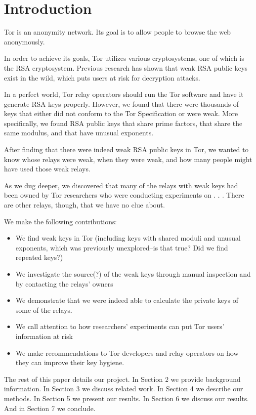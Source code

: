 \section{Introduction}
Tor is an anonymity network.  Its goal is to allow people to browse 
the web anonymously.

In order to achieve its goals, Tor utilizes various cryptosystems, 
one of which is the RSA cryptosystem.  Previous research has 
shown that weak RSA public keys exist in the wild, which puts users at 
risk for decryption attacks.  

In a perfect world, Tor relay operators should run the Tor software and have it 
generate RSA keys properly. However, we found that there were thousands of keys 
that either did not conform to the Tor Specification or were weak.  More 
specifically, we found RSA public keys that share prime factors, 
that share the same modulus, and that have unusual exponents.

After finding that there were indeed weak RSA public keys in Tor, we wanted 
to know whose relays were weak, when they were weak, and how many people might 
have used those weak relays.

As we dug deeper, we discovered that many of the relays with weak keys had been owned 
by Tor researchers who were conducting experiments on . . . There are other 
relays, though, that we have no clue about.

We make the following contributions:
\begin{itemize}
  \item We find weak keys in Tor (including keys with shared moduli 
    and unusual exponents, which was previously unexplored--is that true?
    Did we find repeated keys?)
  \item We investigate the source(?) of the weak keys through manual inspection and by 
    contacting the relays' owners
  \item We demonstrate that we were indeed able to calculate the private keys of 
    some of the relays.
  \item We call attention to how researchers' experiments can put Tor users'
    information at risk
  \item We make recommendations to Tor developers and relay operators on how they can 
    improve their key hygiene.
\end{itemize}

The rest of this paper details our project.  
In Section 2 we provide background information.  In Section 3 we discuss 
related work.  In Section 4 we describe our methods.  In Section 5 we 
present our results.  In Section 6 we discuss our results.  And in Section 7 
we conclude.
